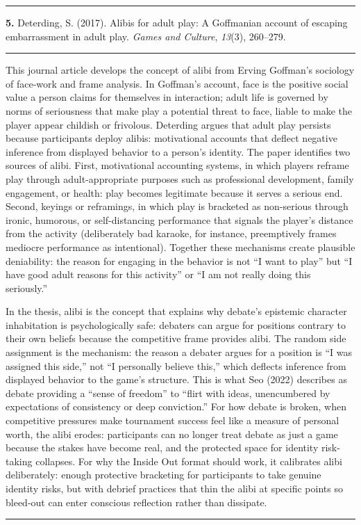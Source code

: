 \documentclass[11pt, a4paper]{article}
\newcommand{\entry}[3]{%
  \vspace{1.8em}
  {\color{rulegray}\rule{\linewidth}{0.4pt}}
  \vspace{0.5em}

  \noindent
  {\large\bfseries\color{accent}#1.}\enspace
  {\normalsize #2}%
  \enspace{\small\scshape\color{taggray}[#3]}

  \vspace{0.35em}
  {\color{accent}\rule{\linewidth}{1.2pt}}
  \vspace{0.2em}
}
\begin{document}
\entry{5}{Deterding, S. (2017). Alibis for adult play: A Goffmanian account of
escaping embarrassment in adult play. \textit{Games and Culture}, \textit{13}(3), 260--279.}{Theoretical Framework}

This journal article develops the concept of alibi from Erving Goffman's
sociology of face-work and frame analysis. In Goffman's account, face is the
positive social value a person claims for themselves in interaction; adult life
is governed by norms of seriousness that make play a potential threat to face,
liable to make the player appear childish or frivolous. Deterding argues that
adult play persists because participants deploy alibis: motivational accounts
that deflect negative inference from displayed behavior to a person's identity.
The paper identifies two sources of alibi. First, motivational accounting
systems, in which players reframe play through adult-appropriate purposes such
as professional development, family engagement, or health: play becomes
legitimate because it serves a serious end. Second, keyings or reframings, in
which play is bracketed as non-serious through ironic, humorous, or
self-distancing performance that signals the player's distance from the
activity (deliberately bad karaoke, for instance, preemptively frames
mediocre performance as intentional). Together these mechanisms create
plausible deniability: the reason for engaging in the behavior is not
\enquote{I want to play} but \enquote{I have good adult reasons for this activity} or
\enquote{I am not really doing this seriously.}

In the thesis, alibi is the concept that explains why debate's epistemic
character inhabitation is psychologically safe: debaters can argue for positions
contrary to their own beliefs because the competitive frame provides alibi. The
random side assignment is the mechanism: the reason a debater argues for a
position is \enquote{I was assigned this side,} not \enquote{I personally believe this,}
which deflects inference from displayed behavior to the game's structure. This
is what Seo (2022) describes as debate providing a \enquote{sense of freedom} to
\enquote{flirt with ideas, unencumbered by expectations of consistency or deep
conviction.} For how debate is broken, when competitive pressures make
tournament success feel like a measure of personal worth, the alibi erodes:
participants can no longer treat debate as just a game because the stakes have
become real, and the protected space for identity risk-taking collapses. For
why the Inside Out format should work, it calibrates alibi deliberately: enough
protective bracketing for participants to take genuine identity risks, but with
debrief practices that thin the alibi at specific points so bleed-out can enter
conscious reflection rather than dissipate.

\vspace{1.8em}
{\color{rulegray}\rule{\linewidth}{0.4pt}}
\end{document}
